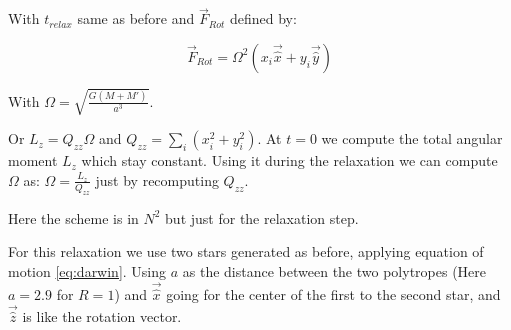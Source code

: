 \documentclass[notes.tex]{subfiles}
\begin{document}
With $t_{relax}$ same as before and $\vec{F}_{Rot}$ defined by:

\begin{equation}
\vec{F}_{Rot} = \Omega^2(x_i \vec{\hat{x}}+y_i\vec{\hat{y}})
\end{equation}

With $\Omega = \sqrt{\frac{G(M+M')}{a^3}}$.

Or $L_z = Q_{zz}\Omega$ and $Q_{zz} = \sum_i(x_i^2+y_i^2)$. At $t=0$ we compute the total angular moment $L_z$ which stay constant.
Using it during the relaxation we can compute $\Omega$ as: $\Omega = \frac{L_z}{Q_{zz}}$ just by recomputing $Q_{zz}$.

Here the scheme is in $N^2$ but just for the relaxation step.

For this relaxation we use two stars generated as before, applying equation of motion \ref{eq:darwin}.
Using $a$ as the distance between the two polytropes  (Here $a=2.9$ for $R=1$) and $\vec{\hat{x}}$ going for the center of the first to the second star, and $\vec{\hat{z}}$ is like the rotation vector.

%

\end{document}
